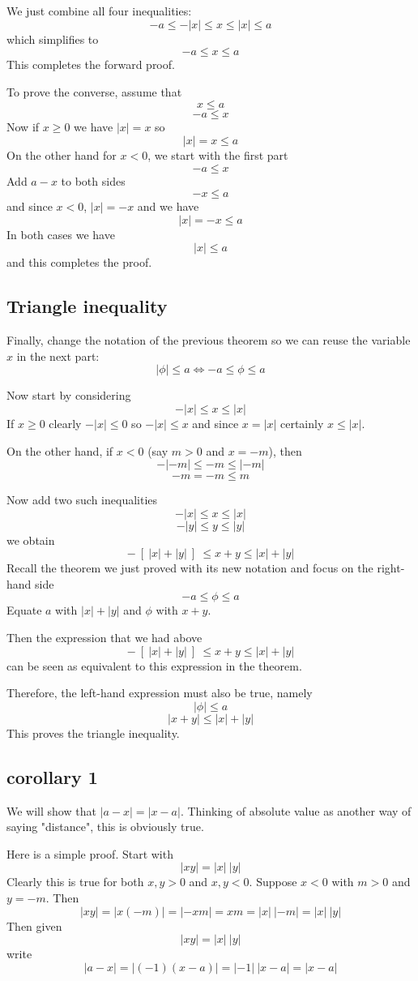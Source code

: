 \documentclass[11pt, oneside]{article}   	%
\begin{document}
We just combine all four inequalities:
\[ -a \le -|x| \le x \le |x| \le a \]
which simplifies to
\[ -a \le x \le a \]
This completes the forward proof.

To prove the converse, assume that
\[ x \le a \]
\[ - a \le x \]
Now if $x \ge 0$ we have $|x| = x$ so
\[ |x| = x \le a \]
On the other hand for $x < 0$, we start with the first part
\[ -a \le x \]
Add $a - x$ to both sides
\[ -x \le a \]
and since $x < 0$, $|x| = -x$ and we have 
\[ |x| =  -x \le a \]
In both cases we have \[ |x| \le a \]
and this completes the proof.

\subsection*{Triangle inequality}
Finally, change the notation of the previous theorem so we can reuse the variable $x$ in the next part:
\[ | \phi | \le a \iff -a \le \phi \le a \]

Now start by considering
\[ - |x| \le x \le |x| \]
If $x \ge 0$ clearly $-|x| \le 0$ so $-|x| \le x$ and since $x = |x|$ certainly $x \le |x|$.

On the other hand, if $x < 0$ (say $m > 0$ and $x = -m$), then
\[ - |-m| \le -m \le |-m| \]
\[ - m = -m \le m \]

Now add two such inequalities 
\[ - |x| \le x \le |x| \]
\[ - |y| \le y \le |y| \]
we obtain
\[ - \ [ \ |x| +  |y| \ ] \  \le x + y \le  |x| + |y|  \]
Recall the theorem we just proved with its new notation and focus on the right-hand side
\[  -a \le \phi \le a \]
Equate $a$ with $|x| + |y|$ and $\phi$ with $x + y$.  

Then the expression that we had above
\[ - \ [ \ |x| +  |y| \ ] \  \le x + y \le  |x| + |y|  \]
can be seen as equivalent to this expression in the theorem.  

Therefore, the left-hand expression must also be true, namely
\[ |\phi| \le a \]
\[ |x + y| \le  |x| +  |y| \]
This proves the triangle inequality.

\subsection*{corollary 1}
We will show that $|a - x| = |x - a|$.  Thinking of absolute value as another way of saying "distance", this is obviously true.

Here is a simple proof.  Start with
\[ |xy| = |x| \ |y| \]
Clearly this is true for both $x,y > 0$ and $x,y < 0$.  Suppose $x < 0$ with $m > 0$ and $y = - m$.  Then
\[ |xy| = |x (-m)| = |-xm| = xm = |x| \ |-m| = |x| \ |y| \]
Then given
\[ |xy| = |x| \ |y| \]
write
\[ |a - x| = |(-1)(x - a)| = |-1| \ |x - a| = |x - a| \]
\end{document}
